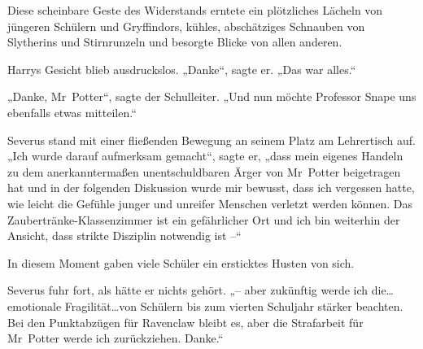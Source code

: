 Diese scheinbare Geste des Widerstands erntete ein plötzliches Lächeln von jüngeren Schülern und Gryffindors, kühles, abschätziges Schnauben von Slytherins und Stirnrunzeln und besorgte Blicke von allen anderen.

Harrys Gesicht blieb ausdruckslos. „Danke“, sagte er. „Das war alles.“

„Danke, Mr~Potter“, sagte der Schulleiter. „Und nun möchte Professor Snape uns ebenfalls etwas mitteilen.“

Severus stand mit einer fließenden Bewegung an seinem Platz am Lehrertisch auf. „Ich wurde darauf aufmerksam gemacht“, sagte er, „dass mein eigenes Handeln zu dem anerkanntermaßen unentschuldbaren Ärger von Mr~Potter beigetragen hat und in der folgenden Diskussion wurde mir bewusst, dass ich vergessen hatte, wie leicht die Gefühle junger und unreifer Menschen verletzt werden können. Das Zaubertränke-Klassenzimmer ist ein gefährlicher Ort und ich bin weiterhin der Ansicht, dass strikte Disziplin notwendig ist –“

In diesem Moment gaben viele Schüler ein ersticktes Husten von sich.

Severus fuhr fort, als hätte er nichts gehört. „– aber zukünftig werde ich die…emotionale Fragilität…von Schülern bis zum vierten Schuljahr stärker beachten. Bei den Punktabzügen für Ravenclaw bleibt es, aber die Strafarbeit für Mr~Potter werde ich zurückziehen. Danke.“

